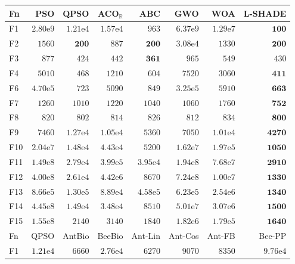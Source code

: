 \begin{tabular}{lrrrrrrr}
\toprule
Fn & PSO & QPSO & ACO$_\mathbb{R}$ & ABC & GWO & WOA & L-SHADE \\
\midrule
F1 & $2.80\mathrm{e}{9}$ & $1.21\mathrm{e}{4}$ & $1.57\mathrm{e}{4}$ & $963$ & $6.37\mathrm{e}{9}$ & $1.29\mathrm{e}{7}$ & $\mathbf{100}$ \\
F2 & $1560$ & $\mathbf{200}$ & $887$ & $\mathbf{200}$ & $3.08\mathrm{e}{4}$ & $1330$ & $\mathbf{200}$ \\
F3 & $877$ & $424$ & $442$ & $\mathbf{361}$ & $965$ & $549$ & $430$ \\
F4 & $5010$ & $468$ & $1210$ & $604$ & $7520$ & $3060$ & $\mathbf{411}$ \\
F6 & $4.70\mathrm{e}{5}$ & $723$ & $5090$ & $849$ & $3.25\mathrm{e}{5}$ & $5910$ & $\mathbf{663}$ \\
F7 & $1260$ & $1010$ & $1220$ & $1040$ & $1060$ & $1760$ & $\mathbf{752}$ \\
F8 & $820$ & $802$ & $814$ & $826$ & $812$ & $834$ & $\mathbf{800}$ \\
F9 & $7460$ & $1.27\mathrm{e}{4}$ & $1.05\mathrm{e}{4}$ & $5360$ & $7050$ & $1.01\mathrm{e}{4}$ & $\mathbf{4270}$ \\
F10 & $2.04\mathrm{e}{7}$ & $1.48\mathrm{e}{4}$ & $4.43\mathrm{e}{4}$ & $5200$ & $1.62\mathrm{e}{7}$ & $1.97\mathrm{e}{5}$ & $\mathbf{1050}$ \\
F11 & $1.49\mathrm{e}{8}$ & $2.79\mathrm{e}{4}$ & $3.99\mathrm{e}{5}$ & $3.95\mathrm{e}{4}$ & $1.94\mathrm{e}{8}$ & $7.68\mathrm{e}{7}$ & $\mathbf{2910}$ \\
F12 & $4.00\mathrm{e}{8}$ & $2.61\mathrm{e}{4}$ & $4.42\mathrm{e}{6}$ & $8670$ & $7.24\mathrm{e}{8}$ & $1.00\mathrm{e}{7}$ & $\mathbf{1330}$ \\
F13 & $8.66\mathrm{e}{5}$ & $1.30\mathrm{e}{5}$ & $8.89\mathrm{e}{4}$ & $4.58\mathrm{e}{5}$ & $6.23\mathrm{e}{5}$ & $2.54\mathrm{e}{6}$ & $\mathbf{1340}$ \\
F14 & $4.45\mathrm{e}{8}$ & $1.49\mathrm{e}{4}$ & $3.48\mathrm{e}{4}$ & $8510$ & $5.01\mathrm{e}{7}$ & $3.07\mathrm{e}{6}$ & $\mathbf{1500}$ \\
F15 & $1.55\mathrm{e}{8}$ & $2140$ & $3140$ & $1840$ & $1.82\mathrm{e}{6}$ & $1.79\mathrm{e}{5}$ & $\mathbf{1640}$ \\
\midrule
Fn & QPSO & AntBio & BeeBio & Ant-Lin & Ant-Cos & Ant-FB & Bee-PP \\
\midrule
F1 & $1.21\mathrm{e}{4}$ & $6660$ & $2.76\mathrm{e}{4}$ & $6270$ & $9070$ & $8350$ & $9.76\mathrm{e}{4}$ \\

\end{tabular}
